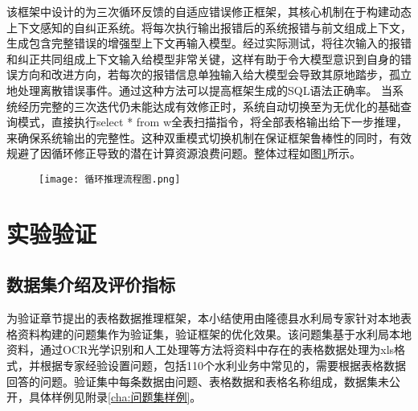 该框架中设计的为三次循环反馈的自适应错误修正框架，其核心机制在于构建动态上下文感知的自纠正系统。将每次执行输出报错后的系统报错与前文组成上下文，生成包含完整错误的增强型上下文再输入模型。经过实际测试，将往次输入的报错和纠正共同组成上下文输入给模型非常关键，这样有助于令大模型意识到自身的错误方向和改进方向，若每次的报错信息单独输入给大模型会导致其原地踏步，孤立地处理离散错误事件。通过这种方法可以提高框架生成的SQL语法正确率。
当系统经历完整的三次迭代仍未能达成有效修正时，系统自动切换至为无优化的基础查询模式，直接执行select * from w全表扫描指令，将全部表格输出给下一步推理，来确保系统输出的完整性。这种双重模式切换机制在保证框架鲁棒性的同时，有效规避了因循环修正导致的潜在计算资源浪费问题。整体过程如图\ref{fig:4-8}所示。
\begin{figure}[h]
    \centering
    \texttt{[image: 循环推理流程图.png]}
    \label{fig:4-8}
\end{figure}

\section{实验验证}
\subsection{数据集介绍及评价指标}
为验证章节提出的表格数据推理框架，本小结使用由隆德县水利局专家针对本地表格资料构建的问题集作为验证集，验证框架的优化效果。该问题集基于水利局本地资料，通过OCR光学识别和人工处理等方法将资料中存在的表格数据处理为xls格式，并根据专家经验设置问题，包括110个水利业务中常见的，需要根据表格数据回答的问题。验证集中每条数据由问题、表格数据和表格名称组成，数据集未公开，具体样例见附录\ref{cha:问题集样例}。

